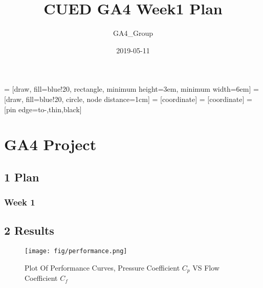 \documentclass[12pt]{article}
\title{CUED GA4 Week1 Plan}
\date{2019-05-11}
\author{GA4_Group}
\begin{document}



 = [draw, fill=blue!20, rectangle, 
    minimum height=3em, minimum width=6em]
 = [draw, fill=blue!20, circle, node distance=1cm]
 = [coordinate]
 = [coordinate]
 = [pin edge={to-,thin,black}]















\newpage

\section*{GA4 Project}
\subsection*{1 Plan}

\subsubsection{Week 1}



\newpage
\subsection*{2 Results}



\par 
\begin{figure}[htb!]
	\centering
    	\texttt{[image: fig/performance.png]}
    	\caption{Plot Of Performance Curves, Pressure Coefficient $C_p$ VS Flow Coefficient $C_f$}
	\label{fig:performance}
\end{figure}
\par
\end{document}
